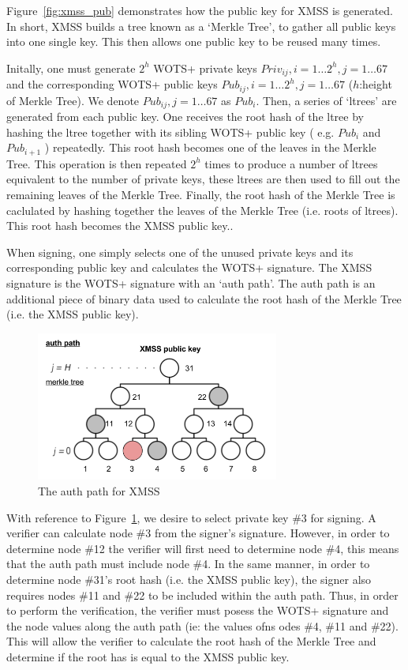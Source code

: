\documentclass[a4paper,10pt,twocolumn]{article}
\begin{document}
Figure~\ref{fig:xmss_pub} demonstrates how the public key for XMSS is generated. In short, XMSS builds a tree known as a `Merkle Tree',
to gather all public keys into one single key. This then allows one public key to be reused many times.

Initally, one must generate \( 2^h \) WOTS+ private keys \( Priv_{ij}, i = 1 \ldots 2^h ,  j=1 \ldots 67\) and the
corresponding WOTS+ public keys \( Pub_{ij}, i = 1 \ldots 2^h , j=1 \ldots 67 \)  (\(h\):height of Merkle Tree). We denote \( Pub_{ij} , 
j=1 \ldots 67 \) as  \( Pub_{i} \). Then, a series of `ltrees' are generated from each public key. One receives the root hash of the 
ltree by hashing the ltree together with its sibling WOTS+ public key ( e.g.  \( Pub_{i} \) and  \( Pub_{i+1} \) ) repeatedly. This root 
hash becomes one of the leaves in the Merkle Tree. This operation is then repeated \( 2^h \) times to produce a number of ltrees 
equivalent to the number of private keys, these ltrees are then used to fill out the remaining leaves of the Merkle Tree. Finally, the 
root hash of the Merkle Tree is caclulated by hashing together the leaves of the Merkle Tree (i.e. roots of ltrees). This root hash 
becomes the XMSS public key..

When signing, one simply selects one of the unused private keys and its corresponding public key and calculates the WOTS+ signature. The 
XMSS signature is the WOTS+ signature with an `auth path'. The auth path is an additional piece of binary data used to calculate the 
root hash of the Merkle Tree (i.e. the XMSS public key).

\begin{figure}[ht]
	\begin{center}
	\includegraphics[width=80mm]{auth_path.png}
	  \caption{The auth path for XMSS}
    \label{fig:xmss_auth}
	\end{center}
 \end{figure}

With reference to Figure~\ref{fig:xmss_auth}, we desire to select private key \#3 for signing. A verifier can calculate node \#3 from the 
signer's signature. However, in order to determine node \#12 the verifier will first need to determine node \#4, this means that the auth 
path must include node \#4. In the same manner, in order to determine node \#31's root hash (i.e. the XMSS public key), the signer also 
requires nodes \#11 and \#22 to be included within the auth path. Thus, in order to perform the verification, the verifier must posess the 
WOTS+ signature and the node values along the auth path (ie: the values ofns odes \#4, \#11 and \#22). This will allow the verifier to 
calculate the root hash of the Merkle Tree and determine if the root has is equal to the XMSS public key.
\end{document}
